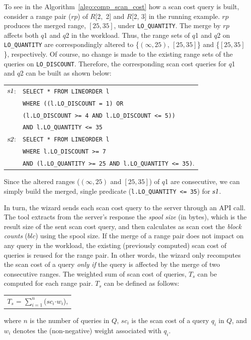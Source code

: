 \documentclass[runningheads]{comsis2}
\def\range#1{$[{#1}]$}
\def\openrange#1{$({#1})$}
\def\Sone{\mbox{\sl s1}}
\def\Stwo{\mbox{\sl s2}}
\begin{document}
To see in the Algorithm~\ref{algo:comp_scan_cost} how a scan cost query is built, 
consider a range pair ($rp$) of \hbox{$R$[2, 2]} and $R$[2, 3] in the running example. 
$rp$ produces the merged range, \range{25, 35}, \hbox{under} {\tt LO\_QUANTITY}. 
The merge by $rp$ affects both $q$1 and $q$2 in the workload. 
Thus, the range sets of $q$1 and $q$2 on {\tt LO\_QUANTITY} are 
correspondingly altered to \{\openrange{\infty, 25}, \range{25, 35}\} and \{\range{25, 35}\}, 
respectively. Of course, no change is made to the existing range sets 
of the queries on {\tt LO\_DISCOUNT}. 
Therefore, the corresponding scan cost queries for $q$1 and $q$2 
can be built as shown below:
\vspace{-.05in}
\begin{center}
\begin{tabular}{rl}
$\Sone$:	& {\tt SELECT * FROM LINEORDER l} \\
		& {\tt WHERE ((l.LO\_DISCOUNT = 1) OR}\\
		& {\tt (l.LO\_DISCOUNT >= 4 AND l.LO\_DISCOUNT <= 5))} \\
		& {\tt AND l.LO\_QUANTITY <= 35}  \\ 
$\Stwo$:	& {\tt SELECT * FROM LINEORDER l} \\
        & {\tt WHERE l.LO\_DISCOUNT >= 7} \\
        & {\tt AND (l.LO\_QUANTITY >= 25 AND l.LO\_QUANTITY <= 35)}.
\end{tabular}
\end{center} 
\vspace{-.05in}
\noindent Since the altered ranges (\openrange{\infty, 25} and \range{25, 35}) of $q$1 
are consecutive, we can simply build the merged, single predicate ({\tt l.LO\_QUANTITY <= 35}) for $\Sone$. 

In turn, the wizard sends each scan cost query to the server through an API call. 
The tool extracts from the server's response the {\em spool size} (in bytes), which is 
the result size of the sent scan cost query, and then 
calculates as scan cost the {\em block counts} ($blc$) using the spool size. 
If the merge of a range pair does not impact on any query in the workload, 
the existing (previously computed) scan cost of queries is reused for the range pair. 
In other words, the wizard only recomputes the scan cost of a query {\em only if} 
the query is affected by the merge of two consecutive ranges. 
The weighted sum of scan cost of queries, $T_{s}$ can be computed 
for each range pair. 
$T_{s}$ can be defined as follows:
\begin{center}
\begin{tabular}{c} 
$T_{s}$ = $\sum_{i=1}^{n}$($sc_{i}${$\cdot$}{$w_{i}$}),
\end{tabular}
\end{center}
where $n$ is the number of queries in $Q$, $sc_{i}$ is the scan cost of a query $q_{i}$ in $Q$, and 
$w_{i}$ denotes the (\hbox{non-negative}) weight associated with $q_{i}$. 
\end{document}
